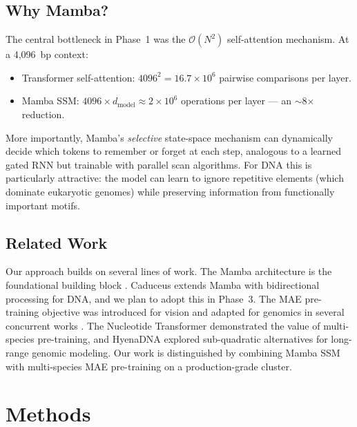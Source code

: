\documentclass[11pt,a4paper,twoside]{article}
\begin{document}
\subsection{Why Mamba?}

The central bottleneck in Phase~1 was the $\mathcal{O}(N^2)$ self-attention
mechanism. At a 4,096~bp context:
\begin{itemize}
    \item Transformer self-attention: $4096^2 = 16.7 \times 10^6$ pairwise
          comparisons per layer.
    \item Mamba SSM: $4096 \times d_{\text{model}} \approx 2 \times 10^6$
          operations per layer --- an $\sim$8$\times$ reduction.
\end{itemize}
More importantly, Mamba's \emph{selective} state-space mechanism
\cite{gu2023mamba} can dynamically decide which tokens to remember or forget
at each step, analogous to a learned gated RNN but trainable with parallel
scan algorithms. For DNA this is particularly attractive: the model can learn
to ignore repetitive elements (which dominate eukaryotic genomes) while
preserving information from functionally important motifs.

\subsection{Related Work}

Our approach builds on several lines of work. The Mamba architecture is the
foundational building block \cite{gu2023mamba}. Caduceus
\cite{schiff2024caduceus} extends Mamba with bidirectional processing for
DNA, and we plan to adopt this in Phase~3. The MAE pre-training objective
was introduced for vision \cite{he2022masked} and adapted for genomics in
several concurrent works \cite{safari2025enhancing}. The Nucleotide
Transformer \cite{dallatorre2023nucleotide} demonstrated the value of
multi-species pre-training, and HyenaDNA \cite{nguyen2023hyenadna} explored
sub-quadratic alternatives for long-range genomic modeling. Our work is
distinguished by combining Mamba SSM with multi-species MAE pre-training on
a production-grade cluster.

\section{Methods}
\label{sec:methods}
\end{document}
